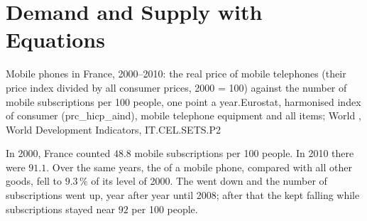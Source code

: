 \chapter{Demand and Supply with Equations}\label{ch:g9:demand-and-supply-equations}

\begin{openingchart}{Mobile phones in France, 2000--2010: the real price of mobile telephones (their
price index divided by all consumer prices, 2000 = 100) against the number of mobile subscriptions per
100 people, one point a year.}{Eurostat, harmonised index of consumer  (prc\_hicp\_aind),
mobile telephone equipment and all items; World , World Development Indicators, IT.CEL.SETS.P2}
\end{openingchart}

In 2000, France counted $48.8$ mobile subscriptions per 100 people. In 2010 there were $91.1$. Over the
same years, the  of a mobile phone, compared with all other goods, fell to $9.3\,\%$ of its level
of 2000. The  went down and the number of subscriptions went up, year after year until 2008; after
that the  kept falling while subscriptions stayed near $92$ per 100 people.

